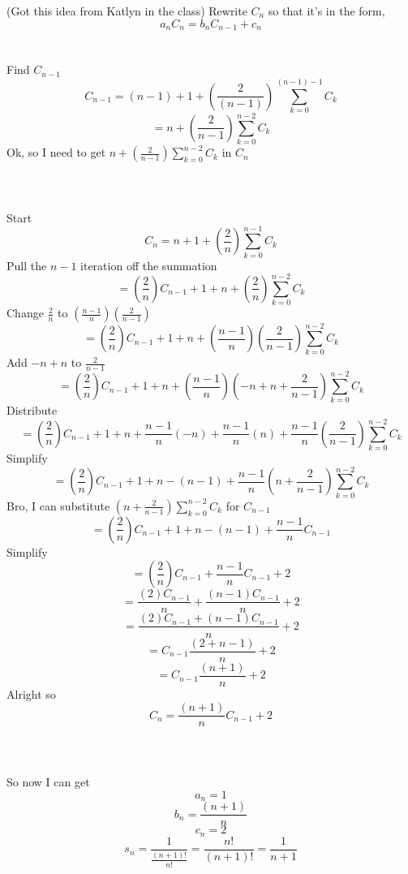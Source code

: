 \documentclass[10pt, AMS Euler]{article}
\begin{document}
            (Got this idea from Katlyn in the class) Rewrite $C_n$ so that it's in the form, 
                $$ a_n C_n = b_n C_{n-1} + c_n $$
            \\ 
            \\
            Find $C_{n-1}$
                $$ C_{n-1} = (n-1) + 1 + (\frac{2}{(n-1)}) \sum_{k=0}^{(n-1)-1} C_k $$
                $$ = n + (\frac{2}{n-1}) \sum_{k=0}^{n-2} C_k $$
            Ok, so I need to get $n + (\frac{2}{n-1}) \sum_{k=0}^{n-2} C_k$ in $C_n$
            \\ 
            \\
            \\
            \\
            Start
                $$ C_n = n + 1 + (\frac{2}{n}) \sum_{k=0}^{n-1} C_k $$
            Pull the $n-1$ iteration off the summation
                $$ = (\frac{2}{n}) C_{n-1} + 1 + n + (\frac{2}{n}) \sum_{k=0}^{n-2} C_k $$
            Change $\frac{2}{n}$ to $(\frac{n-1}{n})(\frac{2}{n-1})$
                $$ = (\frac{2}{n}) C_{n-1} + 1 + n + (\frac{n-1}{n})(\frac{2}{n-1}) \sum_{k=0}^{n-2} C_k $$
            Add $-n+n$ to $\frac{2}{n-1}$
                $$ = (\frac{2}{n}) C_{n-1} + 1 + n + (\frac{n-1}{n})( -n + n + \frac{2}{n-1}) \sum_{k=0}^{n-2} C_k $$
            Distribute
                $$ = (\frac{2}{n}) C_{n-1} + 1 + n + \frac{n-1}{n}(-n) + \frac{n-1}{n}(n) + \frac{n-1}{n}(\frac{2}{n-1}) \sum_{k=0}^{n-2} C_k $$
            Simplify
                $$ = (\frac{2}{n}) C_{n-1} + 1 + n - (n-1) + \frac{n-1}{n} (n + \frac{2}{n-1}) \sum_{k=0}^{n-2} C_k $$
            Bro, I can substitute $(n + \frac{2}{n-1}) \sum_{k=0}^{n-2} C_k$ for $C_{n-1}$
                $$ = (\frac{2}{n}) C_{n-1} + 1 + n - (n-1) + \frac{n-1}{n} C_{n-1} $$
            Simplify
                $$ = (\frac{2}{n}) C_{n-1} + \frac{n-1}{n} C_{n-1} + 2$$
                $$ = \frac{(2)C_{n-1}}{n}  + \frac{(n-1)C_{n-1}}{n} + 2$$
                $$ = \frac{(2)C_{n-1} + (n-1)C_{n-1}}{n} + 2$$
                $$ = C_{n-1}\frac{( 2 + n - 1)}{n} + 2$$
                $$ = C_{n-1}\frac{(n + 1)}{n} + 2$$
            Alright so 
                $$C_n = \frac{(n + 1)}{n} C_{n-1} + 2 $$
            \\
            \\
            \\
            So now I can get
                $$ a_n = 1 $$
                $$ b_n = \frac{(n + 1)}{n} $$
                $$ c_n = 2 $$
                $$ s_n = \frac{1}{\frac{(n+1)!}{n!}} = \frac{n!}{(n+1)!} = \frac{1}{n+1} $$
\end{document}
